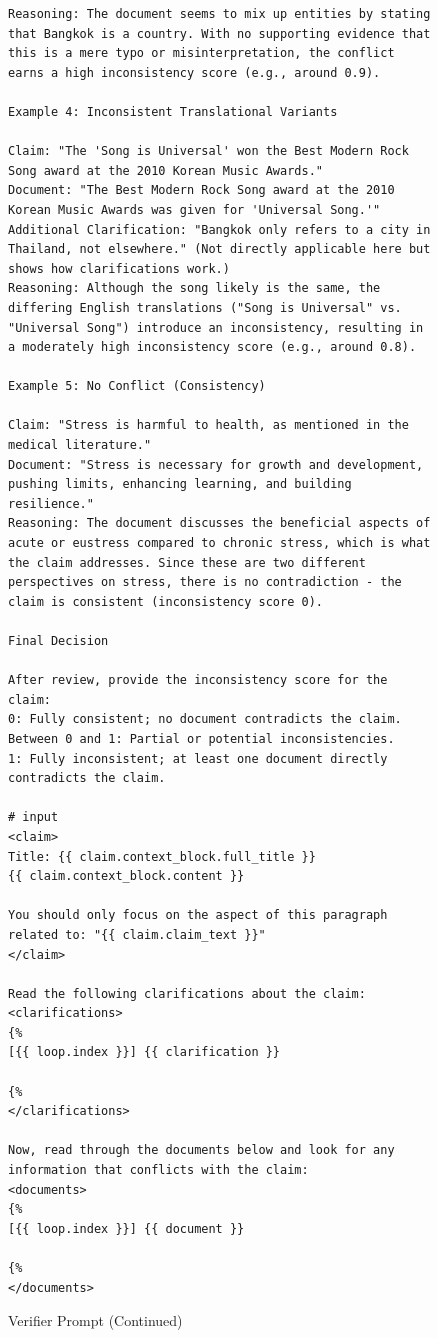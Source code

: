 \begin{figure}[htb]
\begin{lstlisting}
Reasoning: The document seems to mix up entities by stating that Bangkok is a country. With no supporting evidence that this is a mere typo or misinterpretation, the conflict earns a high inconsistency score (e.g., around 0.9).

Example 4: Inconsistent Translational Variants

Claim: "The 'Song is Universal' won the Best Modern Rock Song award at the 2010 Korean Music Awards."
Document: "The Best Modern Rock Song award at the 2010 Korean Music Awards was given for 'Universal Song.'"
Additional Clarification: "Bangkok only refers to a city in Thailand, not elsewhere." (Not directly applicable here but shows how clarifications work.)
Reasoning: Although the song likely is the same, the differing English translations ("Song is Universal" vs. "Universal Song") introduce an inconsistency, resulting in a moderately high inconsistency score (e.g., around 0.8).

Example 5: No Conflict (Consistency)

Claim: "Stress is harmful to health, as mentioned in the medical literature."
Document: "Stress is necessary for growth and development, pushing limits, enhancing learning, and building resilience."
Reasoning: The document discusses the beneficial aspects of acute or eustress compared to chronic stress, which is what the claim addresses. Since these are two different perspectives on stress, there is no contradiction - the claim is consistent (inconsistency score 0).

Final Decision

After review, provide the inconsistency score for the claim:
0: Fully consistent; no document contradicts the claim.
Between 0 and 1: Partial or potential inconsistencies.
1: Fully inconsistent; at least one document directly contradicts the claim.

# input
<claim>
Title: {{ claim.context_block.full_title }}
{{ claim.context_block.content }}

You should only focus on the aspect of this paragraph related to: "{{ claim.claim_text }}"
</claim>

Read the following clarifications about the claim:
<clarifications>
{%
[{{ loop.index }}] {{ clarification }}

{%
</clarifications>

Now, read through the documents below and look for any information that conflicts with the claim:
<documents>
{%
[{{ loop.index }}] {{ document }}

{%
</documents>
\end{lstlisting}

\caption{Verifier Prompt (Continued)} \label{lst:verifier_2}
\end{figure}


